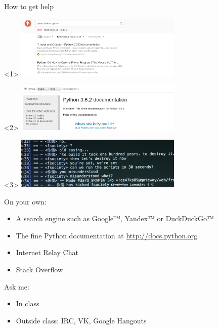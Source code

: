 \documentclass[10pt, compress]{beamer}
\begin{document}
\begin{frame}{How to get help}

\begin{center}
  \begin{onlyenv}<1>
  \includegraphics[width=0.6\textwidth]{graphics/duckduckopenfile.png}
  \end{onlyenv}
  \begin{onlyenv}<2>
  \includegraphics[width=0.6\textwidth]{graphics/pythondocs.png}
  \end{onlyenv}
  \begin{onlyenv}<3>
  \includegraphics[width=0.6\textwidth]{graphics/CKmO8DXVAAAWl1d.png}
  \end{onlyenv}
\end{center}

On your own:
\begin{itemize}
  \item A search engine such as Google™, Yandex™ or DuckDuckGo™
  \item The fine Python documentation at \url{http://docs.python.org}
  \item Internet Relay Chat
  \item Stack Overflow
\end{itemize}

Ask me:
\begin{itemize}
  \item In class
  \item Outside class: IRC, VK, Google Hangouts
\end{itemize}

\end{frame}
\end{document}
